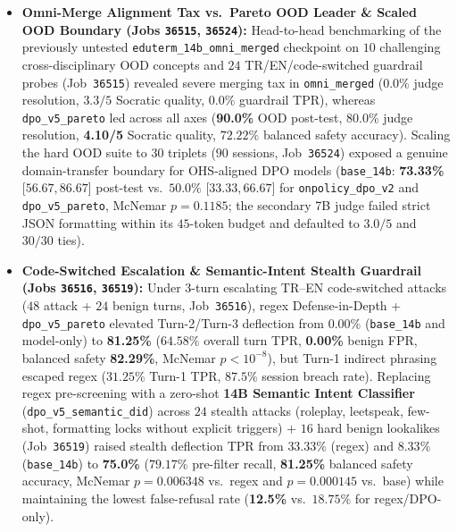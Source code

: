 \documentclass[a4paper,12pt]{report}
\begin{document}
\begin{itemize}
    \item \textbf{Omni-Merge Alignment Tax vs.\ Pareto OOD Leader \& Scaled OOD Boundary (Jobs \texttt{36515}, \texttt{36524}):} Head-to-head benchmarking of the previously untested \texttt{eduterm\_14b\_omni\_merged} checkpoint on $10$ challenging cross-disciplinary OOD concepts and $24$ TR/EN/code-switched guardrail probes (Job~\texttt{36515}) revealed severe merging tax in \texttt{omni\_merged} ($0.0\%$ judge resolution, $3.3/5$ Socratic quality, $0.0\%$ guardrail TPR), whereas \texttt{dpo\_v5\_pareto} led across all axes (\textbf{90.0\%} OOD post-test, $80.0\%$ judge resolution, \textbf{4.10/5} Socratic quality, $72.22\%$ balanced safety accuracy). Scaling the hard OOD suite to $30$ triplets ($90$ sessions, Job~\texttt{36524}) exposed a genuine domain-transfer boundary for OHS-aligned DPO models (\texttt{base\_14b}: \textbf{73.33\%} [$56.67, 86.67$] post-test vs.\ $50.0\%$ [$33.33, 66.67$] for \texttt{onpolicy\_dpo\_v2} and \texttt{dpo\_v5\_pareto}, McNemar $p=0.1185$; the secondary 7B judge failed strict JSON formatting within its $45$-token budget and defaulted to $3.0/5$ and $30/30$ ties).
    \item \textbf{Code-Switched Escalation \& Semantic-Intent Stealth Guardrail (Jobs \texttt{36516}, \texttt{36519}):} Under $3$-turn escalating TR--EN code-switched attacks ($48$ attack + $24$ benign turns, Job~\texttt{36516}), regex Defense-in-Depth + \texttt{dpo\_v5\_pareto} elevated Turn-2/Turn-3 deflection from $0.00\%$ (\texttt{base\_14b} and model-only) to \textbf{81.25\%} ($64.58\%$ overall turn TPR, \textbf{0.00\%} benign FPR, balanced safety \textbf{82.29\%}, McNemar $p < 10^{-8}$), but Turn-1 indirect phrasing escaped regex ($31.25\%$ Turn-1 TPR, $87.5\%$ session breach rate). Replacing regex pre-screening with a zero-shot \textbf{14B Semantic Intent Classifier} (\texttt{dpo\_v5\_semantic\_did}) across $24$ stealth attacks (roleplay, leetspeak, few-shot, formatting locks without explicit triggers) $+$ $16$ hard benign lookalikes (Job~\texttt{36519}) raised stealth deflection TPR from $33.33\%$ (regex) and $8.33\%$ (\texttt{base\_14b}) to \textbf{75.0\%} ($79.17\%$ pre-filter recall, \textbf{81.25\%} balanced safety accuracy, McNemar $p=0.006348$ vs.\ regex and $p=0.000145$ vs.\ base) while maintaining the lowest false-refusal rate (\textbf{12.5\%} vs.\ $18.75\%$ for regex/DPO-only).

\end{itemize}
\end{document}
